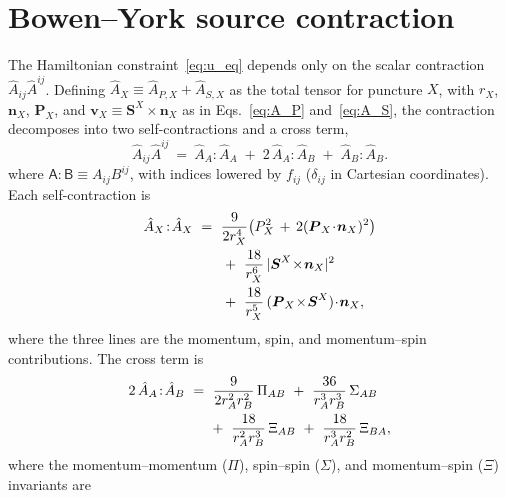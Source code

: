 \documentclass[
  aps,
  prd,
  twocolumn,
  10pt,
  amsmath,
  amssymb,
  nofootinbib,
  superscriptaddress,
  floatfix,
]{revtex4-2}
\newcommand{\vect}[1]{\boldsymbol{#1}}
\newcommand{\Ahat}{\hat{A}}
\begin{document}
\appendix

\section{Bowen--York source contraction}
\label{sec:bycontraction}

The Hamiltonian constraint~\eqref{eq:u_eq} depends only on the scalar contraction
$\Ahat_{ij}\Ahat^{ij}$. Defining
$\Ahat_X \equiv \Ahat_{P,X}+\Ahat_{S,X}$ as the total tensor for
puncture $X$, with $r_X$, $\vect{n}_X$, $\vect{P}_X$, and $\vect{v}_X\equiv\vect{S}^{X}\times\vect{n}_X$ as in Eqs.~\eqref{eq:A_P} and~\eqref{eq:A_S}, the contraction decomposes into two self-contractions and a cross
term,
\begin{equation}
  \Ahat_{ij}\Ahat^{ij} \ = \ \Ahat_A\!:\!\Ahat_A \;+\; 2\,\Ahat_A\!:\!\Ahat_B \; + \; \Ahat_B\!:\!\Ahat_B .
  \label{eq:A2_full}
\end{equation}
where $\mathsf{A}\!:\!\mathsf{B}\equiv A_{ij}B^{ij}$, with indices lowered by $f_{ij}$ ($\delta_{ij}$ in Cartesian coordinates).
Each self-contraction is
\begin{equation}
\begin{aligned}
  \Ahat_X\!:\!\Ahat_X \ &= 
  \ \frac{9}{2r_X^4}\bigl(P_X^2 \, + \, 2(\vect{P}_X\!\cdot\!\vect{n}_X)^2\bigr) \\
  & \hspace{5mm} \ + \ \frac{18}{r_X^6}\,|\vect{S}^{X}\!\times\!\vect{n}_X|^2 \\
  & \hspace{5mm} \ + \ \frac{18}{r_X^5}\,(\vect{P}_X\!\times\!\vect{S}^{X})\!\cdot\!\vect{n}_X ,
\end{aligned}
  \label{eq:A2_self}
\end{equation}
where the three lines are the momentum, spin, and momentum--spin contributions. The cross term is
\begin{equation}
\begin{aligned}
  2\,\Ahat_A\!:\!\Ahat_B
  \ &= \ 
  \frac{9}{2r_A^2 r_B^2}\,\Pi_{AB}
  \ + \ \frac{36}{r_A^3 r_B^3}\,\Sigma_{AB} \\
  & \hspace{5mm} + \ \frac{18}{r_A^2 r_B^3}\,\Xi_{AB}
  \ + \ \frac{18}{r_A^3 r_B^2}\,\Xi_{BA} ,
\end{aligned}
  \label{eq:A2_cross}
\end{equation}
where the momentum--momentum ($\Pi$), spin--spin ($\Sigma$), and
momentum--spin ($\Xi$) invariants are
\end{document}
